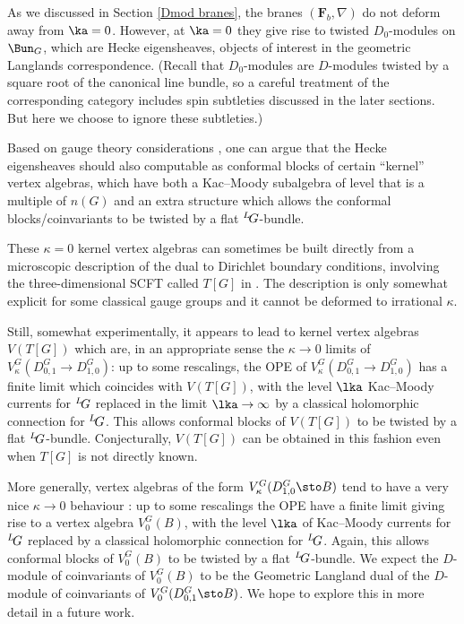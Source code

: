 \documentclass[11pt,reqno]{amsart}
\theoremstyle{plain}
\numberwithin{equation}{section}
\def\neg{\negthinspace}
\def\LG{{}^L\neg G}
\theoremstyle{definition}
\begin{document}
As we discussed in Section \ref{Dmod branes}, the branes $({\mathbf
  F}_b,\nabla)$ do not deform away from $\ka=0$. However, at $\ka=0$
they give rise to twisted $D_0$-modules on $\Bun_G$, which are Hecke
eigensheaves, objects of interest in the geometric Langlands
correspondence. (Recall that $D_0$-modules are $D$-modules twisted by
a square root of the canonical line bundle, so a careful treatment of
the corresponding category includes spin subtleties discussed in the
later sections. But here we choose to ignore these subtleties.)

Based on gauge theory considerations \cite{Ga1, Ga2,CoG}, one can
argue that the Hecke eigensheaves should also computable as conformal
blocks of certain ``kernel'' vertex algebras, which have both a
Kac--Moody subalgebra of level that is a multiple of $n(G)$ and an
extra structure which allows the conformal blocks/coinvariants to be
twisted by a flat $\LG$-bundle.

These $\kappa=0$ kernel vertex algebras can sometimes be built
directly from a microscopic description of the dual to Dirichlet
boundary conditions, involving the three-dimensional SCFT called
$T[G]$ in \cite{GW2}.  The description is only somewhat explicit for
some classical gauge groups and it cannot be deformed to irrational
$\kappa$.

Still, somewhat experimentally, it appears to lead to kernel vertex
algebras $V(T[G])$ which are, in an appropriate sense the $\kappa \to
0$ limits of $V^G_\kappa(D^G_{0,1} \to D^G_{1,0})$: up to some
rescalings, the OPE of $V^G_\kappa(D^G_{0,1} \to D^G_{1,0})$ has a
finite limit which coincides with $V(T[G])$, with the level $\lka$
Kac--Moody currents for $\LG$ replaced in the limit $\lka \to \infty$
by a classical holomorphic connection for $\LG$. This allows conformal
blocks of $V(T[G])$ to be twisted by a flat $\LG$-bundle.
Conjecturally, $V(T[G])$ can be obtained in this fashion even when
$T[G]$ is not directly known.

More generally, vertex algebras of the form $V^G_\kappa(D^G_{1,0}\sto
B)$ tend to have a very nice $\kappa \to 0$ behaviour
\cite{Ga1,Ga2,CG,CoG}: up to some rescalings the OPE have a finite
limit giving rise to a vertex algebra $V^G_0(B)$, with the level
$\lka$ of Kac--Moody currents for $\LG$ replaced by a classical
holomorphic connection for $\LG$. Again, this allows conformal blocks
of $V^G_0(B)$ to be twisted by a flat $\LG$-bundle.  We expect the
$D$-module of coinvariants of $V^G_0(B)$ to be the Geometric Langland
dual of the $D$-module of coinvariants of $V^G_0(D^G_{0,1}\sto B)$.
We hope to explore this in more detail in a future work.
\end{document}

